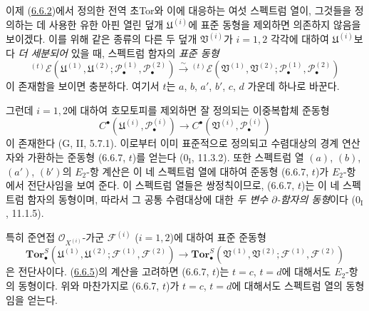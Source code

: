 \begin{env}[6.6.7]
\label{III.6.6.7-fr}
이제 (\hyperref[III.6.6.2-fr]{6.6.2})에서 정의한 전역 초Tor와 이에
대응하는 여섯 스펙트럼 열이, 그것들을 정의하는 데 사용한 유한 아핀
열린 덮개 $\mathfrak U^{(i)}$에 표준 동형을 제외하면 의존하지 않음을
보이겠다. 이를 위해 같은 종류의 다른 두 덮개 $\mathfrak V^{(i)}$가
$i=1,2$ 각각에 대하여 $\mathfrak U^{(i)}$보다 \emph{더 세분되어}
있을 때, 스펙트럼 함자의 \emph{표준 동형}
\[
  {}^{(t)}\mathscr E
  (\mathfrak U^{(1)},\mathfrak U^{(2)};
   \mathscr P_\bullet^{(1)},\mathscr P_\bullet^{(2)})
  \xrightarrow{\sim}
  {}^{(t)}\mathscr E
  (\mathfrak V^{(1)},\mathfrak V^{(2)};
   \mathscr P_\bullet^{(1)},\mathscr P_\bullet^{(2)})
  \tag{6.6.7, $t$}\label{III.6.6.7.t.fr}
\]
이 존재함을 보이면 충분하다. 여기서 $t$는 $a$, $b$, $a'$, $b'$,
$c$, $d$ 가운데 하나로 바꾼다.

그런데 $i=1,2$에 대하여 호모토피를 제외하면 잘 정의되는 이중복합체
준동형
\[
  C^\bullet(\mathfrak U^{(i)},\mathscr P_\bullet^{(i)})
  \longrightarrow
  C^\bullet(\mathfrak V^{(i)},\mathscr P_\bullet^{(i)})
\]
이 존재한다 (G, II, 5.7.1). 이로부터 이미 표준적으로 정의되고
수렴대상의 경계 연산자와 가환하는 준동형 (6.6.7, $t$)를 얻는다
($0_{\mathrm I}$, 11.3.2). 또한 스펙트럼 열 $(a)$, $(b)$, $(a')$,
$(b')$의 $E_2$-항 계산은 이 네 스펙트럼 열에 대하여 준동형
(6.6.7, $t$)가 $E_2$-항에서 전단사임을 보여 준다. 이 스펙트럼
열들은 쌍정칙이므로, (6.6.7, $t$)는 이 네 스펙트럼 함자의 동형이며,
따라서 그 공통 수렴대상에 대한 \emph{두 변수 $\partial$-함자의
동형}이다 ($0_{\mathrm I}$, 11.1.5).

특히 준연접 $\mathscr O_{X^{(i)}}$-가군 $\mathscr F^{(i)}$
($i=1,2$)에 대하여 표준 준동형
\[
  \mathbf{Tor}_\bullet^S
  (\mathfrak U^{(1)},\mathfrak U^{(2)};
   \mathscr F^{(1)},\mathscr F^{(2)})
  \longrightarrow
  \mathbf{Tor}_\bullet^S
  (\mathfrak V^{(1)},\mathfrak V^{(2)};
   \mathscr F^{(1)},\mathscr F^{(2)})
\]
은 전단사이다. (\hyperref[III.6.6.5-fr]{6.6.5})의 계산을 고려하면
(6.6.7, $t$)는 $t=c$, $t=d$에 대해서도 $E_2$-항의 동형이다.
위와 마찬가지로 (6.6.7, $t$)가 $t=c$, $t=d$에 대해서도 스펙트럼
열의 동형임을 얻는다.



\end{env}
